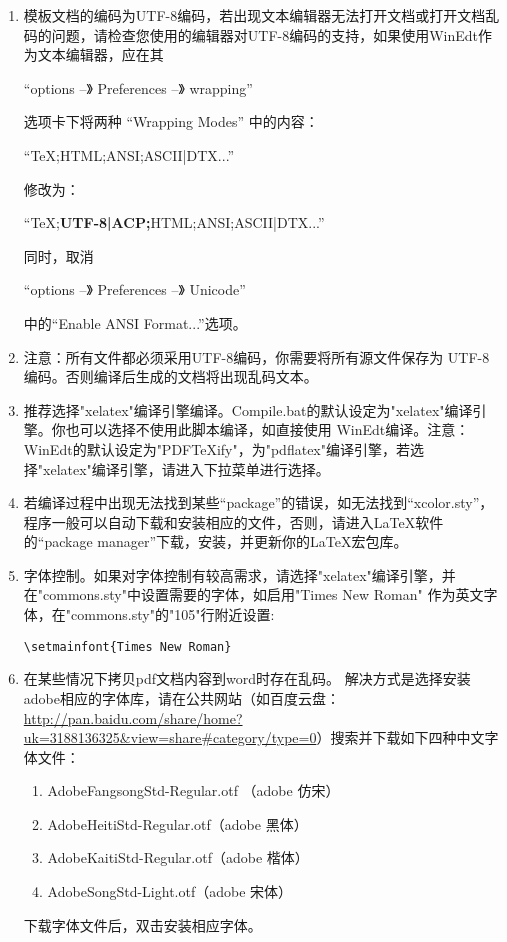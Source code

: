 \begin{enumerate}
  \item 模板文档的编码为UTF-8编码，若出现文本编辑器无法打开文档或打开文档乱码的问题，请检查您使用的编辑器对UTF-8编码的支持，如果使用WinEdt作为文本编辑器，应在其

  “options --》 Preferences --》 wrapping”

  选项卡下将两种 “Wrapping Modes” 中的内容：

  “TeX;HTML;ANSI;ASCII|DTX...”

  修改为：

  “TeX;\textbf{UTF-8|ACP;}HTML;ANSI;ASCII|DTX...”

  同时，取消

  “options --》 Preferences --》 Unicode”

  中的“Enable ANSI Format...”选项。
  \item 注意：所有文件都必须采用UTF-8编码，你需要将所有源文件保存为 UTF-8 编码。否则编译后生成的文档将出现乱码文本。
  \item 推荐选择"xelatex"编译引擎编译。Compile.bat的默认设定为"xelatex"编译引擎。你也可以选择不使用此脚本编译，如直接使用 WinEdt编译。注意：WinEdt的默认设定为"PDFTeXify"，为"pdflatex"编译引擎，若选择"xelatex"编译引擎，请进入下拉菜单进行选择。
  \item 若编译过程中出现无法找到某些“package”的错误，如无法找到“xcolor.sty”，程序一般可以自动下载和安装相应的文件，否则，请进入\LaTeX{}软件的“package manager”下载，安装，并更新你的\LaTeX{}宏包库。
  \item 字体控制。如果对字体控制有较高需求，请选择"xelatex"编译引擎，并在"commons.sty"中设置需要的字体，如启用"Times New Roman" 作为英文字体，在"commons.sty"的"105"行附近设置:

      \verb+\setmainfont{Times New Roman}+
  \item 在某些情况下拷贝pdf文档内容到word时存在乱码。
      解决方式是选择安装adobe相应的字体库，请在公共网站（如百度云盘：\url{http://pan.baidu.com/share/home?uk=3188136325&view=share#category/type=0}）搜索并下载如下四种中文字体文件：
      \begin{enumerate}
          \item AdobeFangsongStd-Regular.otf （adobe 仿宋）
          \item AdobeHeitiStd-Regular.otf（adobe 黑体）
          \item AdobeKaitiStd-Regular.otf（adobe 楷体）
          \item AdobeSongStd-Light.otf（adobe 宋体）
      \end{enumerate}
      下载字体文件后，双击安装相应字体。
      

\end{enumerate}
